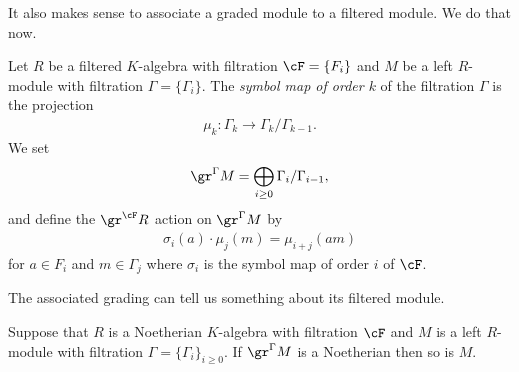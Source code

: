 \bigskip

It also makes sense to associate a graded module to a filtered module. We do that now.
\begin{defn}\label{defn:associated-graded-module}
	Let $R$ be a filtered $K$-algebra with filtration $\cF = \{F_i\}$ and $M$ be a left $R$-module with filtration $\Gamma = \{\Gamma_i\}$. The \emph{symbol map of order $k$} of the filtration $\Gamma$ is the projection
	\begin{align*}
		\mu_k:\Gamma_k \to \Gamma_k/\Gamma_{k-1}.
	\end{align*}
	We set
	\begin{align*}
		\gr^\Gamma M = \bigoplus_{i\geq 0} \Gamma_i/\Gamma_{i-1},
	\end{align*}
	and define the $\gr^\cF R$ action on $\gr^\Gamma M$ by
	\begin{align*}
		\sigma_i(a)\cdot \mu_j(m) = \mu_{i+j}(a m)
	\end{align*}
	for $a \in F_i$ and $m \in \Gamma_j$ where $\sigma_i$ is the symbol map of order $i$ of $\cF$.
\end{defn}
The associated grading can tell us something about its filtered module.
\begin{thm}\label{thm:noeth-assoc-graded-module}
	Suppose that $R$ is a Noetherian $K$-algebra with filtration $\cF$ and $M$ is a left $R$-module with filtration $\Gamma = \{\Gamma_i\}_{i\geq 0}$. If $\gr^\Gamma M$ is a Noetherian then so is $M$.
\end{thm}
